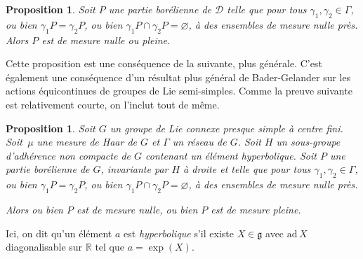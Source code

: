 \documentclass[JEP,XML,SOM,Unicode,francais,published]{cedram}
\newcommand{\R}{\mathbb{R}}
\newtheorem{prop}[thm]{Proposition}
\theoremstyle{definition}
\begin{document}
\begin{prop}
\label{prop-pavage}
Soit $P$ une partie borélienne de $\mathscr{D}$ telle que pour tous $\gamma_1, \gamma_2 \in \Gamma$, ou bien $\gamma_1P = \gamma_2P$, ou bien $\gamma_1P \cap \gamma_2P = \varnothing$, à des ensembles de mesure nulle près.
Alors $P$ est de mesure nulle ou pleine.
\end{prop}
Cette proposition est une conséquence de la suivante, plus générale. C'est également une conséquence d'un résultat plus général de Bader-Gelander \cite[cor.\,6.7]{BaderGelander} sur les actions équicontinues de groupes de Lie semi-simples. Comme la preuve suivante est relativement courte, on l'inclut tout de même.
\begin{prop}
Soit $G$ un groupe de Lie connexe presque simple à centre fini. Soit~$\mu$ une mesure de Haar de $G$ et $\Gamma$ un réseau de $G$.
Soit $H$ un sous-groupe d'adhérence non compacte de $G$ contenant un élément hyperbolique.
Soit $P$ une partie boré\-lienne de $G$, invariante par $H$ à droite et telle que pour tous $\gamma_1, \gamma_2 \in \Gamma$, ou bien $\gamma_1P = \gamma_2P$, ou bien $\gamma_1P \cap \gamma_2P = \varnothing$, à des ensembles de mesure nulle près.

Alors ou bien $P$ est de mesure nulle, ou bien $P$ est de mesure pleine.
\end{prop}
Ici, on dit qu'un élément $a$ est \emph{hyperbolique} s'il existe $X \in \mathfrak{g}$ avec $\mathrm{ad}\,X$ diagonalisable sur $\R$ tel que $a = \exp(X)$.
\end{document}
